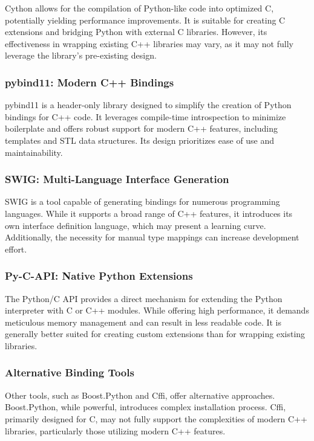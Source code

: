 Cython allows for the compilation of Python-like code into optimized C, potentially yielding performance improvements. It is suitable for creating C extensions and bridging Python with external C libraries. However, its effectiveness in wrapping existing C++ libraries may vary, as it may not fully leverage the library's pre-existing design.

\subsubsection{pybind11: Modern C++ Bindings}

pybind11 is a header-only library designed to simplify the creation of Python bindings for C++ code. It leverages compile-time introspection to minimize boilerplate and offers robust support for modern C++ features, including templates and \ac{STL} data structures. Its design prioritizes ease of use and maintainability.

\subsubsection{SWIG: Multi-Language Interface Generation}

SWIG is a tool capable of generating bindings for numerous programming languages. While it supports a broad range of C++ features, it introduces its own interface definition language, which may present a learning curve. Additionally, the necessity for manual type mappings can increase development effort.

\subsubsection{Py-C-API: Native Python Extensions}

The Python/C API provides a direct mechanism for extending the Python interpreter with C or C++ modules. While offering high performance, it demands meticulous memory management and can result in less readable code. It is generally better suited for creating custom extensions than for wrapping existing libraries.

\subsubsection{Alternative Binding Tools}

Other tools, such as Boost.Python and Cffi, offer alternative approaches. Boost.Python, while powerful, introduces complex installation process. Cffi, primarily designed for C, may not fully support the complexities of modern C++ libraries, particularly those utilizing modern C++ features.
